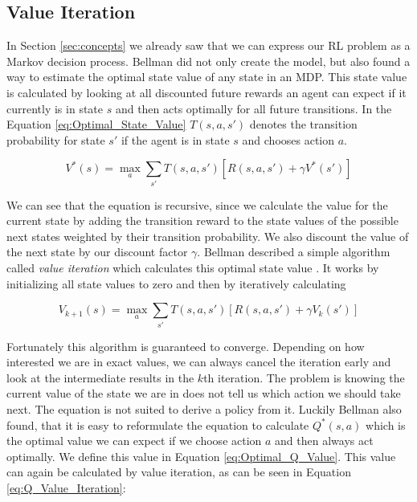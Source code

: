 \subsection{Value Iteration} \label{ssec:Value_Iteration}

In Section \ref{sec:concepts} we already saw that we can express our RL problem as a Markov decision process. Bellman did not only create the model, but also found a way to estimate the optimal state value of any state in an MDP. This state value is calculated by looking at all discounted future rewards an agent can expect if it currently is in state $s$ and then acts optimally for all future transitions. In the Equation \ref{eq:Optimal_State_Value} $T(s, a, s')$ denotes the transition probability for state $s'$ if the agent is in state $s$ and chooses action $a$.  

\begin{equation} \label{eq:Optimal_State_Value}
V^*(s) = \max_a \sum_{s'} T(s, a, s')\left[ R(s, a, s') + \gamma V^*(s')\right]
\end{equation}

We can see that the equation is recursive, since we calculate the value for the current state by adding the transition reward to the state values of the possible next states weighted by their transition probability. We also discount the value of the next state by our discount factor $\gamma$. Bellman described a simple algorithm called \textit{value iteration} which calculates this optimal state value \cite{bellman1957markovian}. It works by initializing all state values to zero and then by iteratively calculating

\[V_{k+1}(s) = \max_a \sum_{s'} T(s, a, s')\left[ R(s, a, s') + \gamma V_k(s')\right]\]

Fortunately this algorithm is guaranteed to converge. Depending on how interested we are in exact values, we can always cancel the iteration early and look at the intermediate results in the $k$th iteration. The problem is knowing the current value of the state we are in does not tell us which action we should take next. The equation is not suited to derive a policy from it. Luckily Bellman also found, that it is easy to reformulate the equation to calculate $Q^*(s, a)$ which is the optimal value we can expect if we choose action $a$ and then always act optimally. We define this value in Equation \ref{eq:Optimal_Q_Value}. This value can again be calculated by value iteration, as can be seen in Equation \ref{eq:Q_Value_Iteration}:

